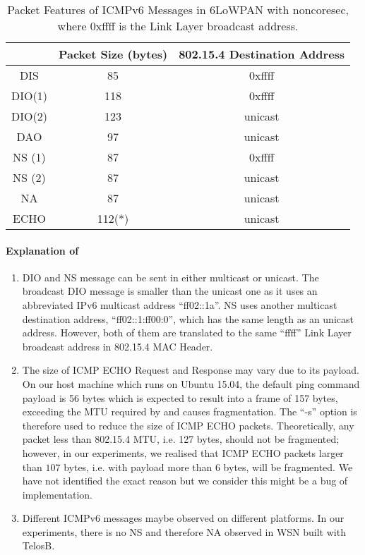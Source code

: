 \begin{table}[ht!]
	\center
	\begin{tabular}{|c|c|c|}
		\hline
		       & Packet Size (bytes) & 802.15.4 Destination Address \\ \hline
		DIS    & 85                  & 0xffff                       \\ \hline
		DIO(1) & 118                 & 0xffff                       \\ \hline
		DIO(2) & 123                 & unicast                      \\ \hline
		DAO    & 97                  & unicast                      \\ \hline
		NS (1) & 87                  & 0xffff                       \\ \hline
		NS (2) & 87                  & unicast                      \\ \hline
		NA     & 87                  & unicast                      \\ \hline
		ECHO   & 112(*)               & unicast                      \\ \hline
	\end{tabular}
	\caption{Packet Features of ICMPv6 Messages in 6LoWPAN with noncoresec, where 0xffff is the Link Layer broadcast address.}
	\label{Tbl: Packet Features of ICMPv6 Messages in 6LoWPAN with noncoresec}
\end{table}


\paragraph{Explanation of }
\begin{enumerate}
	\item DIO and NS message can be sent in either multicast or unicast. The broadcast DIO message is smaller than the unicast one as it uses an abbreviated IPv6 multicast address ``ff02::1a''. NS uses another multicast destination address, ``ff02::1:ff00:0'', which has the same length as an unicast address. However, both of them are translated to the same ``ffff'' Link Layer broadcast address in 802.15.4 MAC Header.
	\item The size of ICMP ECHO Request and Response may vary due to its payload. On our host machine which runs on Ubuntu 15.04, the default ping command payload is 56 bytes which is expected to result into a frame of 157 bytes, exceeding the MTU required by \cite{802154} and causes fragmentation. The ``-s'' option is therefore used to reduce the size of ICMP ECHO packets. Theoretically, any packet less than 802.15.4 MTU, i.e. 127 bytes, should not be fragmented; however, in our experiments, we realised that ICMP ECHO packets larger than $107$ bytes, i.e. with payload more than $6$ bytes, will be fragmented. We have not identified the exact reason but we consider this might be a bug of implementation.
	\item Different ICMPv6 messages maybe observed on different platforms. In our experiments, there is no NS and therefore NA observed in WSN built with TelosB.
\end{enumerate}

